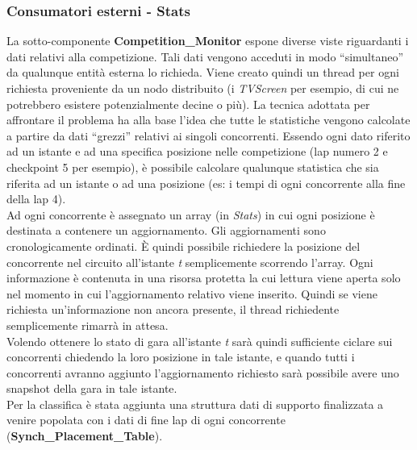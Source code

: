 \subsubsection{Consumatori esterni - Stats}
La sotto-componente \textbf{Competition\_Monitor} espone diverse viste riguardanti i dati relativi alla competizione. Tali dati vengono acceduti in modo ``simultaneo'' 
da qualunque entit\`{a} esterna lo richieda. Viene creato quindi un thread per ogni richiesta proveniente da un nodo distribuito (i \emph{TVScreen} per esempio, di cui
ne potrebbero esistere potenzialmente decine o pi\`{u}). La tecnica adottata
per affrontare il problema ha alla base l'idea che tutte le statistiche vengono calcolate a partire da dati ``grezzi'' relativi ai singoli concorrenti. Essendo ogni
dato riferito ad un istante e ad una specifica posizione nelle competizione (lap numero 2 e checkpoint 5 per esempio), \`{e} possibile calcolare qualunque statistica
che sia riferita ad un istante o ad una posizione (es: i tempi di ogni concorrente alla fine della lap 4).\\
Ad ogni concorrente \`{e} assegnato un array (in \emph{Stats}) in cui ogni posizione \`{e} destinata a contenere un aggiornamento. Gli aggiornamenti sono cronologicamente ordinati.
\`{E} quindi possibile richiedere la posizione del concorrente nel circuito all'istante \emph{t} semplicemente scorrendo l'array. Ogni informazione \`{e} contenuta in una risorsa
protetta la cui lettura viene aperta solo nel momento in cui l'aggiornamento relativo viene inserito. Quindi se viene richiesta un'informazione non ancora presente,
il thread richiedente semplicemente rimarr\`{a} in attesa.\\
Volendo ottenere lo stato di gara all'istante \emph{t} sar\`{a} quindi sufficiente ciclare sui concorrenti chiedendo la loro posizione in tale istante, e quando tutti i concorrenti
avranno aggiunto l'aggiornamento richiesto sar\`{a} possibile avere uno snapshot della gara in tale istante.\\
Per la classifica \`{e} stata aggiunta una struttura dati di supporto finalizzata a venire popolata con i dati di fine lap di ogni concorrente (\textbf{Synch\_Placement\_Table}).
